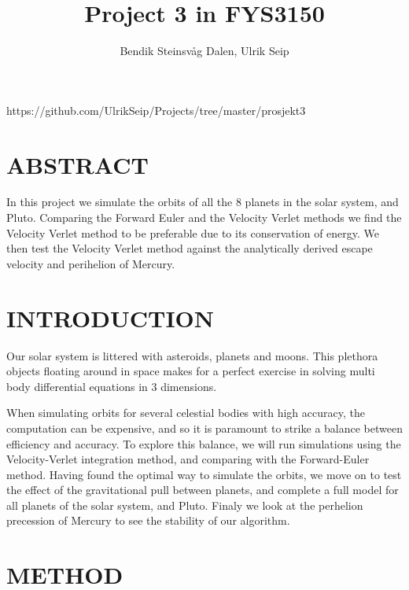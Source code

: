 \documentclass[a4paper]{article}
\title{Project 3 in FYS3150}
\author{Bendik Steinsvåg Dalen, Ulrik Seip}
\begin{document}
\maketitle

https://github.com/UlrikSeip/Projects/tree/master/prosjekt3

\section{ABSTRACT}
In this project we simulate the orbits of all the 8 planets in the solar system, and Pluto. Comparing the Forward Euler and the Velocity Verlet methods we find the Velocity Verlet method to be preferable due to its conservation of energy. We then test the Velocity Verlet method against the analytically derived escape velocity and perihelion of Mercury.

\section{INTRODUCTION}
Our solar system is littered with asteroids, planets and moons. This plethora objects floating around in space makes for a perfect exercise in solving multi body differential equations in 3 dimensions.

When simulating orbits for several celestial bodies with high accuracy, the computation can be expensive, and so it is paramount to strike a balance  between efficiency and accuracy. To explore this balance, we will run simulations using the Velocity-Verlet integration method, and comparing with the Forward-Euler method. Having found the optimal way to simulate the orbits, we move on to test the effect of the gravitational pull between planets, and complete a full model for all planets of the solar system, and Pluto. Finaly we look at the perhelion precession of Mercury to see the stability of our algorithm.


\section{METHOD}
\end{document}
